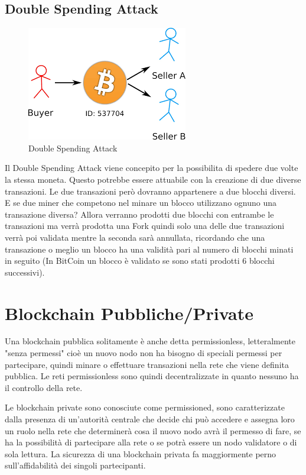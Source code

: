 \documentclass[11pt,a4paper,titlepage]{report}
\begin{document}
\subsection{Double Spending Attack}
\begin{figure}[h]
	\includegraphics[height=0.2\textheight]{dsa}
	\centering
	\caption{Double Spending Attack}
	\label{fig:ds-attack}
\end{figure}
Il Double Spending Attack viene concepito per la possibilita di spedere due volte la stessa moneta. Questo potrebbe essere attuabile con la creazione di due diverse transazioni. Le due transazioni però dovranno appartenere a due blocchi diversi. E se due miner che competono nel minare un blocco utilizzano ognuno una transazione diversa? Allora verranno prodotti due blocchi con entrambe le transazioni ma verrà prodotta una Fork quindi solo una delle due transazioni verrà poi validata mentre la seconda sarà annullata, ricordando che una transazione o meglio un blocco ha una validità pari al numero di blocchi minati in seguito (In BitCoin un blocco è validato se sono stati prodotti 6 blocchi successivi).

\section{Blockchain Pubbliche/Private}
Una blockchain pubblica solitamente è anche detta permissionless, letteralmente "senza permessi" cioè un nuovo nodo non ha bisogno di speciali permessi per partecipare, quindi minare o effettuare transazioni nella rete che viene definita pubblica. Le reti permissionless sono quindi decentralizzate in quanto nessuno ha il controllo della rete.

Le blockchain private sono conosciute come permissioned, sono caratterizzate dalla presenza di un’autorità centrale che decide chi può accedere e assegna loro un ruolo nella rete che determinerà cosa il nuovo nodo avrà il permesso di fare, se ha la possibilità di partecipare alla rete o se potrà essere un nodo validatore o di sola lettura. La sicurezza di una blockchain privata fa maggiormente perno sull'affidabilità dei singoli partecipanti.
\end{document}
